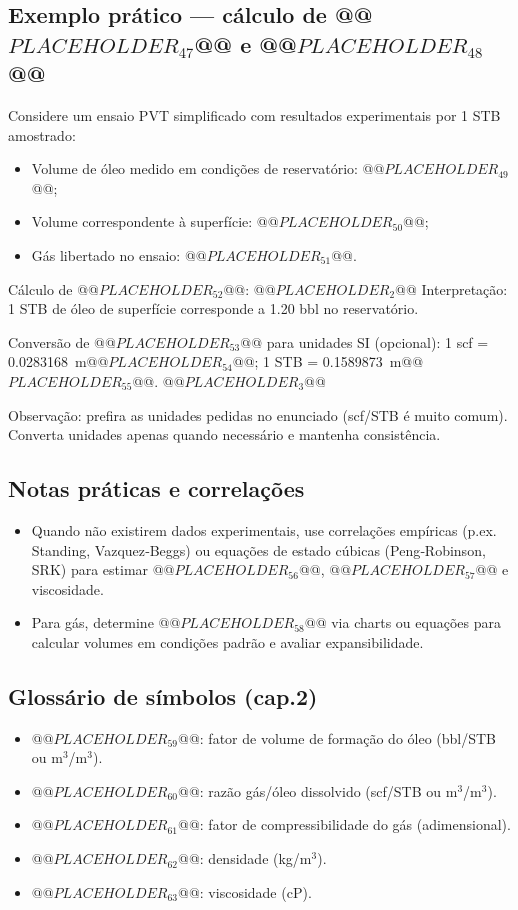 \documentclass[11pt,a4paper]{article}
\begin{document}
\subsection{Exemplo prático — cálculo de @@$PLACEHOLDER_{47}$@@ e @@$PLACEHOLDER_{48}$@@}
Considere um ensaio PVT simplificado com resultados experimentais por 1 STB amostrado:
\begin{itemize}
\item Volume de óleo medido em condições de reservatório: @@$PLACEHOLDER_{49}$@@;
\item Volume correspondente à superfície: @@$PLACEHOLDER_{50}$@@;
\item Gás libertado no ensaio: @@$PLACEHOLDER_{51}$@@.
\end{itemize}

Cálculo de @@$PLACEHOLDER_{52}$@@:
@@$PLACEHOLDER_{2}$@@
Interpretação: 1 STB de óleo de superfície corresponde a 1.20 bbl no reservatório.

Conversão de @@$PLACEHOLDER_{53}$@@ para unidades SI (opcional):
1 scf = 0.0283168~m@@$PLACEHOLDER_{54}$@@; 1 STB = 0.1589873~m@@$PLACEHOLDER_{55}$@@.
@@$PLACEHOLDER_{3}$@@

Observação: prefira as unidades pedidas no enunciado (scf/STB é muito comum). Converta unidades apenas quando necessário e mantenha consistência.

\subsection{Notas práticas e correlações}
\begin{itemize}
\item Quando não existirem dados experimentais, use correlações empíricas (p.ex. Standing, Vazquez‑Beggs) ou equações de estado cúbicas (Peng‑Robinson, SRK) para estimar @@$PLACEHOLDER_{56}$@@, @@$PLACEHOLDER_{57}$@@ e viscosidade.
\item Para gás, determine @@$PLACEHOLDER_{58}$@@ via charts ou equações para calcular volumes em condições padrão e avaliar expansibilidade.
\end{itemize}

\subsection{Glossário de símbolos (cap.2)}
\begin{itemize}
\item @@$PLACEHOLDER_{59}$@@: fator de volume de formação do óleo (bbl/STB ou m$^3$/m$^3$).
\item @@$PLACEHOLDER_{60}$@@: razão gás/óleo dissolvido (scf/STB ou m$^3$/m$^3$).
\item @@$PLACEHOLDER_{61}$@@: fator de compressibilidade do gás (adimensional).
\item @@$PLACEHOLDER_{62}$@@: densidade (kg/m$^3$).
\item @@$PLACEHOLDER_{63}$@@: viscosidade (cP).
\end{itemize}
\end{document}
